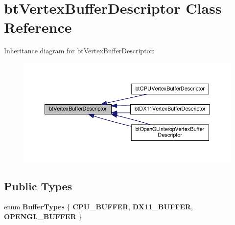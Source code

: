 \hypertarget{classbtVertexBufferDescriptor}{}\section{bt\+Vertex\+Buffer\+Descriptor Class Reference}
\label{classbtVertexBufferDescriptor}


Inheritance diagram for bt\+Vertex\+Buffer\+Descriptor\+:
\nopagebreak
\begin{figure}[H]
\begin{center}
\leavevmode
\includegraphics[width=350pt]{classbtVertexBufferDescriptor__inherit__graph}
\end{center}
\end{figure}
\subsection*{Public Types}
\begin{DoxyCompactItemize}
\item 
\mbox{\label{classbtVertexBufferDescriptor_a90f92d0f6b588348cfd365cf70596e8f}} 
enum {\bfseries Buffer\+Types} \{ {\bfseries C\+P\+U\+\_\+\+B\+U\+F\+F\+ER}, 
{\bfseries D\+X11\+\_\+\+B\+U\+F\+F\+ER}, 
{\bfseries O\+P\+E\+N\+G\+L\+\_\+\+B\+U\+F\+F\+ER}
 \}
\end{DoxyCompactItemize}
